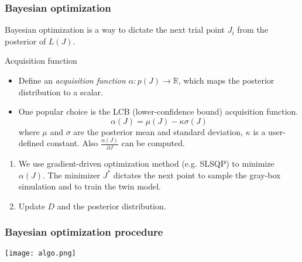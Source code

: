 \documentclass{beamer}
\begin{document}
\begin{frame}
    \frametitle{Bayesian optimization}\small
    Bayesian optimization is a way to dictate the next trial point $J_i$ from the
    posterior of $L(J)$.
    \begin{exampleblock}{Acquisition function}
        \begin{itemize}
            \item Define an \emph{acquisition function} $\alpha: p(J) \rightarrow \mathbb{R}$,
                  which maps the posterior distribution to a scalar.
            \item One popular choice is the LCB (lower-confidence bound) acquisition function.
            $$
                \alpha(J)= \mu(J) - \kappa \sigma(J)
            $$
            where $\mu$ and $\sigma$ are the posterior mean and standard deviation, $\kappa$
            is a user-defined constant. Also $\frac{\alpha(J)}{\partial J}$ can be computed.
        \end{itemize}
    \end{exampleblock}
    \begin{enumerate}
        \item We use gradient-driven optimization method (e.g. SLSQP) to minimize $\alpha(J)$.
              The minimizer $J^*$ dictates the next point to sample the gray-box simulation and
              to train the twin model. 
        \item Update $D$ and the posterior distribution.
    \end{enumerate}
\end{frame}

\begin{frame}
    \frametitle{Bayesian optimization procedure}
    \begin{center}
        \texttt{[image: algo.png]}
    \end{center}
\end{frame}
\end{document}
